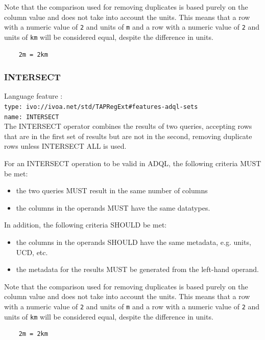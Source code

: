 \documentclass[11pt,a4paper]{ivoa}
\begin{document}
Note that the comparison used for removing duplicates is based purely on the
column value and does not take into account the units.
This means that a row with a numeric value of \verb:2: and units of \verb:m:
and a row with a numeric value of \verb:2: and units of \verb:km: will be
considered equal, despite the difference in units.
\begin{verbatim}
    2m = 2km
\end{verbatim}

\subsubsection{INTERSECT}
{\footnotesize Language feature :}\\
{\footnotesize \verb|type: ivo://ivoa.net/std/TAPRegExt#features-adql-sets|}\\
{\footnotesize \verb|name: INTERSECT|}\\

The INTERSECT operator combines the results of two queries, accepting rows that are
in the first set of results but are not in the second,
removing duplicate rows unless INTERSECT ALL is used.

For an INTERSECT operation to be valid in ADQL, the following criteria MUST be met:

\begin{itemize}
    \item the two queries MUST result in the same number of columns
    \item the columns in the operands MUST have the same datatypes.
\end{itemize}

In addition, the following criteria SHOULD be met: 
\begin{itemize}
    \item the columns in the operands SHOULD have the same metadata, e.g. units, UCD, etc.
    \item the metadata for the results MUST be generated from the left-hand operand.
\end{itemize}

Note that the comparison used for removing duplicates is based purely on the
column value and does not take into account the units.
This means that a row with a numeric value of \verb:2: and units of \verb:m:
and a row with a numeric value of \verb:2: and units of \verb:km: will be
considered equal, despite the difference in units.
\begin{verbatim}
    2m = 2km
\end{verbatim}
\end{document}
